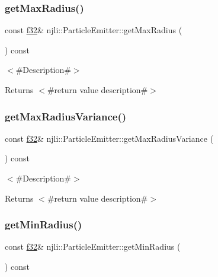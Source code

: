 \subsubsection{\texorpdfstring{get\+Max\+Radius()}{getMaxRadius()}}
{\footnotesize\ttfamily const \mbox{\hyperlink{_util_8h_a5f6906312a689f27d70e9d086649d3fd}{f32}}\& njli\+::\+Particle\+Emitter\+::get\+Max\+Radius (\begin{DoxyParamCaption}{ }\end{DoxyParamCaption}) const}

$<$\#\+Description\#$>$

\begin{DoxyReturn}{Returns}
$<$\#return value description\#$>$ 
\end{DoxyReturn}
\mbox{\label{classnjli_1_1_particle_emitter_a732f82ef7fe93be9dda217530ea6406a}} 
\subsubsection{\texorpdfstring{get\+Max\+Radius\+Variance()}{getMaxRadiusVariance()}}
{\footnotesize\ttfamily const \mbox{\hyperlink{_util_8h_a5f6906312a689f27d70e9d086649d3fd}{f32}}\& njli\+::\+Particle\+Emitter\+::get\+Max\+Radius\+Variance (\begin{DoxyParamCaption}{ }\end{DoxyParamCaption}) const}

$<$\#\+Description\#$>$

\begin{DoxyReturn}{Returns}
$<$\#return value description\#$>$ 
\end{DoxyReturn}
\mbox{\label{classnjli_1_1_particle_emitter_a02d57b64ad821c30fc608fef4bfcb446}} 
\subsubsection{\texorpdfstring{get\+Min\+Radius()}{getMinRadius()}}
{\footnotesize\ttfamily const \mbox{\hyperlink{_util_8h_a5f6906312a689f27d70e9d086649d3fd}{f32}}\& njli\+::\+Particle\+Emitter\+::get\+Min\+Radius (\begin{DoxyParamCaption}{ }\end{DoxyParamCaption}) const}


